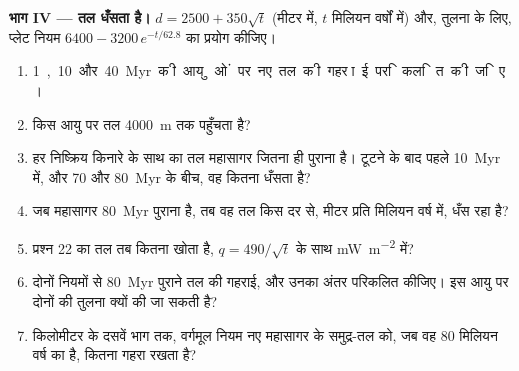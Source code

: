 \begin{problem}
\medskip
\noindent\textbf{भाग IV --- तल धँसता है।} $d = 2500 + 350\sqrt t$ (मीटर में, $t$ मिलियन वर्षों में) और, तुलना के लिए, प्लेट नियम $6400 - 3200\,e^{-t/62.8}$ का प्रयोग कीजिए।
\begin{enumerate}[resume]
  \item \qty{1}, \qty{10} और \qty{40}{Myr} की आयुओं पर नए तल की गहराई परिकलित कीजिए।
  \item किस आयु पर तल \qty{4000}{m} तक पहुँचता है?
  \item हर निष्क्रिय किनारे के साथ का तल महासागर जितना ही पुराना है। टूटने के बाद पहले \qty{10}{Myr} में, और 70 और \qty{80}{Myr} के बीच, वह कितना धँसता है?
  \item जब महासागर \qty{80}{Myr} पुराना है, तब वह तल किस दर से, मीटर प्रति मिलियन वर्ष में, धँस रहा है?
  \item प्रश्न 22 का तल तब कितना  खोता है, $q = 490/\sqrt t$ के साथ \unit{mW.m^{-2}} में?
  \item दोनों नियमों से \qty{80}{Myr} पुराने तल की गहराई, और उनका अंतर परिकलित कीजिए। इस आयु पर दोनों की तुलना क्यों की जा सकती है?
  \item किलोमीटर के दसवें भाग तक, वर्गमूल नियम नए महासागर के समुद्र-तल को, जब वह 80 मिलियन वर्ष का है, कितना गहरा रखता है?
\end{enumerate}
\end{problem}
